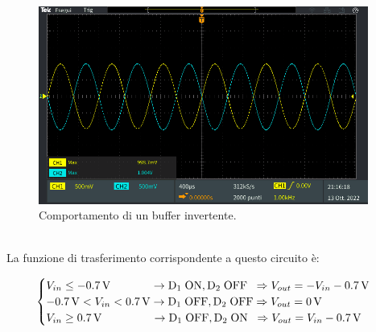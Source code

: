 \documentclass{report}
\begin{document}
\begin{figure}[h]
	\centering
	\includegraphics[height=6.5cm]{immagini/TEK00023}
	\caption{Comportamento di un buffer invertente.}
	\label{figura:TEK00023}
\end{figure}
\\La funzione di trasferimento corrispondente a questo circuito è:

\begin{equation}
   \begin{cases}
   V_{in}\le \SI{-0.7}{\volt}\;\;\indent\indent\rightarrow \mathrm{D_1\; ON, D_2\;OFF}\;\; \Rightarrow V_{out} = -V_{in}-\SI{0.7}{\volt}\\
  \SI{-0.7}{\volt} < V_{in}< \SI{0.7}{\volt}\rightarrow \mathrm{D_1\; OFF, D_2\;OFF} \Rightarrow V_{out} = \SI{0}{\volt}\\
   V_{in}\ge \SI{0.7}{\volt}\;\;\;\;\;\indent\indent\rightarrow \mathrm{D_1\; OFF, D_2\;ON}\;\; \Rightarrow V_{out} = V_{in}-\SI{0.7}{\volt}
   \end{cases}
\end{equation}
\end{document}
